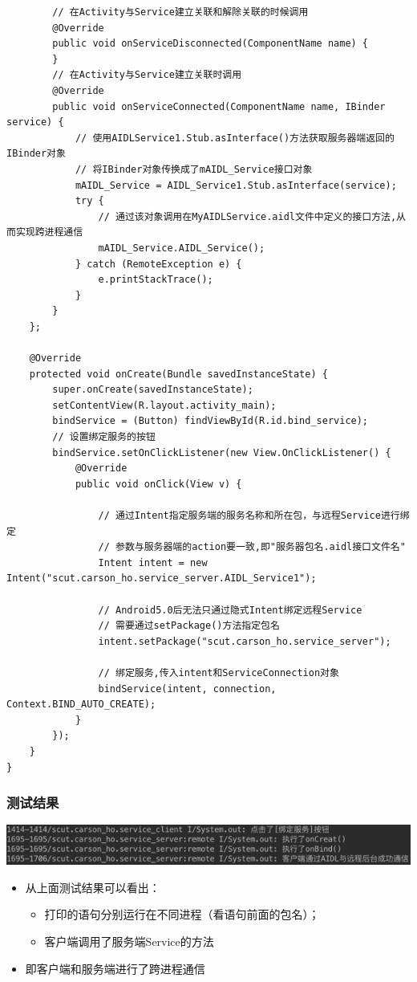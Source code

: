 \documentclass[9pt, b5paper]{article}
\begin{document}
\begin{itemize}
\begin{verbatim}
        // 在Activity与Service建立关联和解除关联的时候调用
        @Override
        public void onServiceDisconnected(ComponentName name) {
        }
        // 在Activity与Service建立关联时调用
        @Override
        public void onServiceConnected(ComponentName name, IBinder service) {
            // 使用AIDLService1.Stub.asInterface()方法获取服务器端返回的IBinder对象
            // 将IBinder对象传换成了mAIDL_Service接口对象
            mAIDL_Service = AIDL_Service1.Stub.asInterface(service);
            try {
                // 通过该对象调用在MyAIDLService.aidl文件中定义的接口方法,从而实现跨进程通信
                mAIDL_Service.AIDL_Service();
            } catch (RemoteException e) {
                e.printStackTrace();
            }
        }
    };

    @Override
    protected void onCreate(Bundle savedInstanceState) {
        super.onCreate(savedInstanceState);
        setContentView(R.layout.activity_main);
        bindService = (Button) findViewById(R.id.bind_service);
        // 设置绑定服务的按钮
        bindService.setOnClickListener(new View.OnClickListener() {
            @Override
            public void onClick(View v) {

                // 通过Intent指定服务端的服务名称和所在包，与远程Service进行绑定
                // 参数与服务器端的action要一致,即"服务器包名.aidl接口文件名"
                Intent intent = new Intent("scut.carson_ho.service_server.AIDL_Service1");

                // Android5.0后无法只通过隐式Intent绑定远程Service
                // 需要通过setPackage()方法指定包名
                intent.setPackage("scut.carson_ho.service_server");

                // 绑定服务,传入intent和ServiceConnection对象
                bindService(intent, connection, Context.BIND_AUTO_CREATE);
            }
        });
    }
}
\end{verbatim}
\end{itemize}
\subsubsection{测试结果}
\label{sec-5-6-3}

\includegraphics[width=.9\linewidth]{./pic/serverClient.png}
\begin{itemize}
\item 从上面测试结果可以看出：
\begin{itemize}
\item 打印的语句分别运行在不同进程（看语句前面的包名）；
\item 客户端调用了服务端Service的方法
\end{itemize}
\item 即客户端和服务端进行了跨进程通信
\end{itemize}
\end{document}
